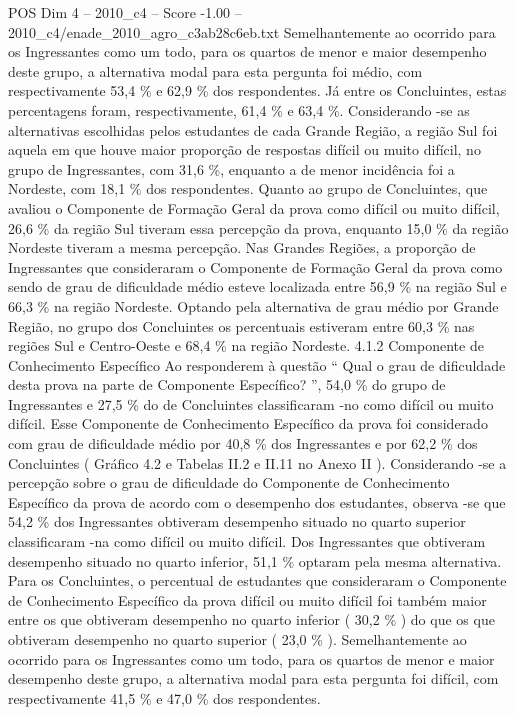 \begin{textsample}{POS Dim 4 – 2010\_c4 – Score -1.00 – 2010\_c4/enade\_2010\_agro\_c3ab28c6eb.txt}
Semelhantemente ao ocorrido para os Ingressantes como um todo, para os quartos de menor e maior desempenho deste grupo, a alternativa modal para esta pergunta foi médio, com respectivamente 53,4 \% e 62,9 \% dos respondentes.
Já entre os Concluintes, estas percentagens foram, respectivamente, 61,4 \% e 63,4 \%.
Considerando -se as alternativas escolhidas pelos estudantes de cada Grande Região, a região Sul foi aquela em que houve maior proporção de respostas difícil ou muito difícil, no grupo de Ingressantes, com 31,6 \%, enquanto a de menor incidência foi a Nordeste, com 18,1 \% dos respondentes.
Quanto ao grupo de Concluintes, que avaliou o Componente de Formação Geral da prova como difícil ou muito difícil, 26,6 \% da região Sul tiveram essa percepção da prova, enquanto 15,0 \% da região Nordeste tiveram a mesma percepção.
Nas Grandes Regiões, a proporção de Ingressantes que consideraram o Componente de Formação Geral da prova como sendo de grau de dificuldade médio esteve localizada entre 56,9 \% na região Sul e 66,3 \% na região Nordeste.
Optando pela alternativa de grau médio por Grande Região, no grupo dos Concluintes os percentuais estiveram entre 60,3 \% nas regiões Sul e Centro-Oeste e 68,4 \% na região Nordeste. 4.1.2 Componente de Conhecimento Específico Ao responderem à questão “ Qual o grau de dificuldade desta prova na parte de Componente Específico? ”, 54,0 \% do grupo de Ingressantes e 27,5 \% do de Concluintes classificaram -no como difícil ou muito difícil.
Esse Componente de Conhecimento Específico da prova foi considerado com grau de dificuldade médio por 40,8 \% dos Ingressantes e por 62,2 \% dos Concluintes ( Gráfico 4.2 e Tabelas II.2 e II.11 no Anexo II ).
Considerando -se a percepção sobre o grau de dificuldade do Componente de Conhecimento Específico da prova de acordo com o desempenho dos estudantes, observa -se que 54,2 \% dos Ingressantes obtiveram desempenho situado no quarto superior classificaram -na como difícil ou muito difícil.
Dos Ingressantes que obtiveram desempenho situado no quarto inferior, 51,1 \% optaram pela mesma alternativa.
Para os Concluintes, o percentual de estudantes que consideraram o Componente de Conhecimento Específico da prova difícil ou muito difícil foi também maior entre os que obtiveram desempenho no quarto inferior ( 30,2 \% ) do que os que obtiveram desempenho no quarto superior ( 23,0 \% ).
Semelhantemente ao ocorrido para os Ingressantes como um todo, para os quartos de menor e maior desempenho deste grupo, a alternativa modal para esta pergunta foi difícil, com respectivamente 41,5 \% e 47,0 \% dos respondentes.

\end{textsample}
